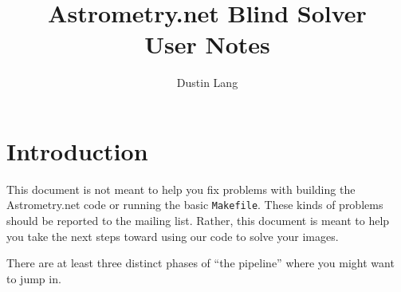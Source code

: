 \documentclass[12pt,letterpaper]{article}
\newcommand{\an}{Astrometry.net}
\newcommand{\code}[1]{\texttt{#1}}
\begin{document}
\title{Astrometry.net Blind Solver \\ User Notes}
\author{Dustin Lang}

\maketitle

\newpage

\section*{Introduction}

This document is not meant to help you fix problems with building the \an{} code or 
running the basic \code{Makefile}.  These kinds of problems should be reported to the
mailing list.  Rather, this document is meant to help you take the next steps toward
using our code to solve your images.


There are at least three distinct phases of ``the pipeline'' where you might want to
jump in.  
\end{document}
